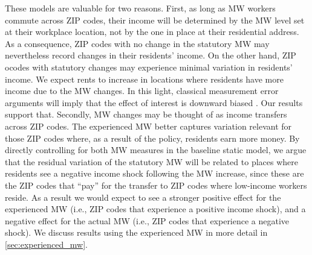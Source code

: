 These models are valuable for two reasons. First, as long as MW workers commute across ZIP codes, 
their income will be determined by the 
MW level set at their workplace location, not by the one in place at their residential address.
As a consequence, ZIP codes with no change in 
the statutory MW may nevertheless record changes in their residents' income. On the other hand, 
ZIP ocodes with statutory changes may experience minimal variation in residents' income. 
We expect rents to increase in locations where residents have more income due to the MW 
changes. In this light, classical measurement error arguments will imply that the effect of 
interest is downward biased \parencite{AngristPischke2009}. Our results support that.  Secondly, 
MW changes may be thought of as income transfers across ZIP codes. 
The experienced MW better captures variation relevant for those ZIP codes 
where, as a result of the policy, residents earn more money. 
By directly controlling for both MW measures in the baseline static model, 
we argue that the residual variation of the statutory MW will be related to places where 
residents see a negative income shock following the MW increase, since these are the 
ZIP codes that ``pay'' for the transfer to ZIP codes where low-income workers reside. 
As a result we would expect to see a stronger positive effect for the experienced MW 
(i.e., ZIP codes that experience a positive income shock), and a negative effect for 
the actual MW (i.e., ZIP codes that experience a negative shock). We discuss results using the 
experienced MW in more detail in \autoref{sec:experienced_mw}.



